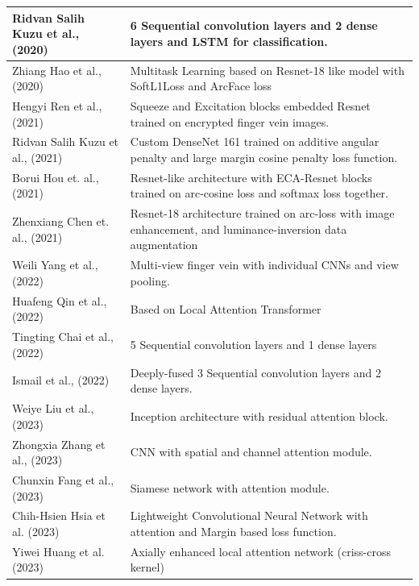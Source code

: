 \documentclass[10pt,journal,compsoc]{IEEEtran}
\begin{document}
\begin{table}[hbt!]
{\begin{tabular}{|l|p{4in}|}
                Ridvan Salih Kuzu et al., \cite{2020_2} (2020) & 6 Sequential convolution layers and 2 dense layers and LSTM for classification.\\ \hline
                Zhiang Hao et al., \cite{2020_3} (2020) & Multitask Learning based on Resnet-18 like model with SoftL1Loss and ArcFace loss\\
                \hline
                Hengyi Ren et al., \cite{2021_1} (2021) &  Squeeze and Excitation blocks embedded Resnet trained on encrypted finger vein images.\\ \hline
                Ridvan Salih Kuzu et al., \cite{2021_2} (2021) & Custom DenseNet 161 trained on additive angular penalty and large margin cosine penalty loss function. \\ \hline
                Borui Hou et. al., \cite{arcvein} (2021) & Resnet-like architecture with ECA-Resnet blocks trained on arc-cosine loss and softmax loss together.\\ \hline
                Zhenxiang Chen et. al., \cite{chenresnetarcloss} (2021) & Resnet-18 architecture trained on arc-loss with image enhancement, and luminance-inversion data augmentation\\ \hline
                Weili Yang et al., \cite{2022_1} (2022) & Multi-view finger vein with individual CNNs and view pooling. \\ \hline
                Huafeng Qin et al., \cite{2022_2} (2022) & Based on Local Attention Transformer\\ \hline
                Tingting Chai et al., \cite{2022_3} (2022) &  5 Sequential convolution layers and 1 dense layers \\ \hline
                Ismail et al., \cite{ism} (2022) &  Deeply-fused 3 Sequential convolution layers and 2 dense layers. \\ \hline
                Weiye Liu et al., \cite{2023_1} (2023) & Inception architecture with residual attention block.\\ \hline
                Zhongxia Zhang et al., \cite{2023_2} (2023) & CNN with spatial and channel attention module.\\ \hline
                Chunxin Fang et al., \cite{2023_3} (2023) & Siamese network with attention module.\\ \hline
                Chih-Hsien Hsia et al. \cite{2023_4} (2023) & Lightweight Convolutional Neural Network with attention and Margin based loss function.\\ \hline
                Yiwei Huang et al. \cite{2023_5} (2023) & Axially enhanced local attention network (criss-cross kernel) \\ \hline

\end{tabular}}
\end{table}
\end{document}
